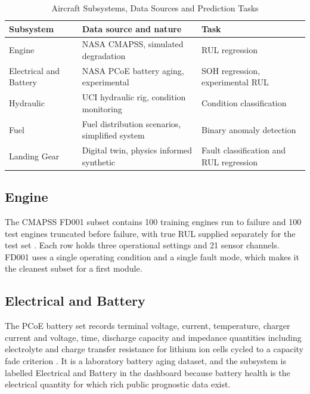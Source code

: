 \documentclass[conference]{IEEEtran}
\begin{document}
\begin{table}[htbp]
\caption{Aircraft Subsystems, Data Sources and Prediction Tasks}
\begin{center}
\footnotesize
\setlength{\tabcolsep}{3pt}
\begin{tabular}{|p{0.75in}|p{1.45in}|p{0.85in}|}
\hline
\textbf{Subsystem} & \textbf{Data source and nature} & \textbf{Task} \\
\hline
Engine & NASA CMAPSS, simulated degradation \cite{b8, b9} & RUL regression \\
\hline
Electrical and Battery & NASA PCoE battery aging, experimental \cite{b16} & SOH regression, experimental RUL \\
\hline
Hydraulic & UCI hydraulic rig, condition monitoring \cite{b25} & Condition classification \\
\hline
Fuel & Fuel distribution scenarios, simplified system \cite{b33} & Binary anomaly detection \\
\hline
Landing Gear & Digital twin, physics informed synthetic \cite{b39} & Fault classification and RUL regression \\
\hline
\end{tabular}
\label{tab_scope}
\end{center}
\end{table}

\subsection{Engine}
The CMAPSS FD001 subset contains 100 training engines run to failure and 100 test engines truncated before failure, with true RUL supplied separately for the test set \cite{b9}. Each row holds three operational settings and 21 sensor channels. FD001 uses a single operating condition and a single fault mode, which makes it the cleanest subset for a first module.

\subsection{Electrical and Battery}
The PCoE battery set records terminal voltage, current, temperature, charger current and voltage, time, discharge capacity and impedance quantities including electrolyte and charge transfer resistance for lithium ion cells cycled to a capacity fade criterion \cite{b16}. It is a laboratory battery aging dataset, and the subsystem is labelled Electrical and Battery in the dashboard because battery health is the electrical quantity for which rich public prognostic data exist.
\end{document}
